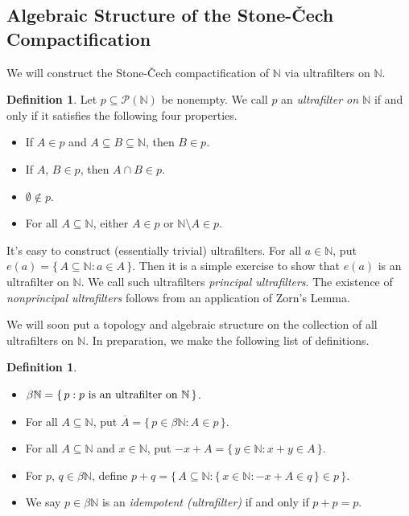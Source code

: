 \documentclass[12pt]{article}
\theoremstyle{plain}
\theoremstyle{definition}
\newtheorem{defn}[thm]{Definition}
\newcommand{\bbN}{\mathbb{N}}
\begin{document}
\subsection{Algebraic Structure of the Stone-\v{C}ech Compactification}
We will construct the Stone-\v{C}ech compactification of $\bbN$ via
ultrafilters on $\bbN$.
  \begin{defn}
    \label{defn:uf}
    Let $p \subseteq \mathcal{P}(\bbN)$ be nonempty.
    We call $p$ an \textsl{ultrafilter on $\bbN$} if and only if it
    satisfies the following four properties.
      \begin{itemize}
        \item[(1)] If $A \in p$ and $A \subseteq B \subseteq \bbN$,
          then $B \in p$.
        \item[(2)] If $A$, $B \in p$, then $A \cap B \in p$.
        \item[(3)] $\emptyset \not\in p$.
        \item[(4)] For all $A \subseteq \bbN$, either $A \in p$ or
          $\bbN \setminus A \in p$.
      \end{itemize}
  \end{defn}
It's easy to construct (essentially trivial) ultrafilters. 
For all $a \in \bbN$, put $e(a) = \{\, A \subseteq \bbN : a \in A
\,\}$.
Then it is a simple exercise to show that $e(a)$ is an ultrafilter on
$\bbN$. 
We call such ultrafilters \textsl{principal ultrafilters}. 
The existence of \textsl{nonprincipal ultrafilters} follows from an
application of Zorn's Lemma. 

We will soon put a topology and algebraic structure on the collection
of all ultrafilters on $\bbN$. 
In preparation, we make the following list of definitions.

  \begin{defn}
    \label{defn:alg}
    \begin{itemize}
      \item[(a)] $\beta\bbN = \{\, p : \hbox{$p$ is an ultrafilter on
          $\bbN$} \,\}$.
      \item[(b)] For all $A \subseteq \bbN$, put $\overline{A} = \{\,
        p \in \beta\bbN : A \in p \,\}$.
      \item[(c)] For all $A \subseteq \bbN$ and $x \in \bbN$, put
        $-x+A = \{\, y \in \bbN : x+y \in A \,\}$.
      \item[(d)] For $p$, $q \in \beta\bbN$, define
        $p+q = \bigl\{\, A \subseteq \bbN : \{\, x \in \bbN : -x +A \in q
        \,\} \in p \,\bigr\}$.
      \item[(e)] We say $p \in \beta\bbN$ is an \textsl{idempotent
          (ultrafilter)} if  and only if $p + p = p$.
    \end{itemize}
  \end{defn}
\end{document}
